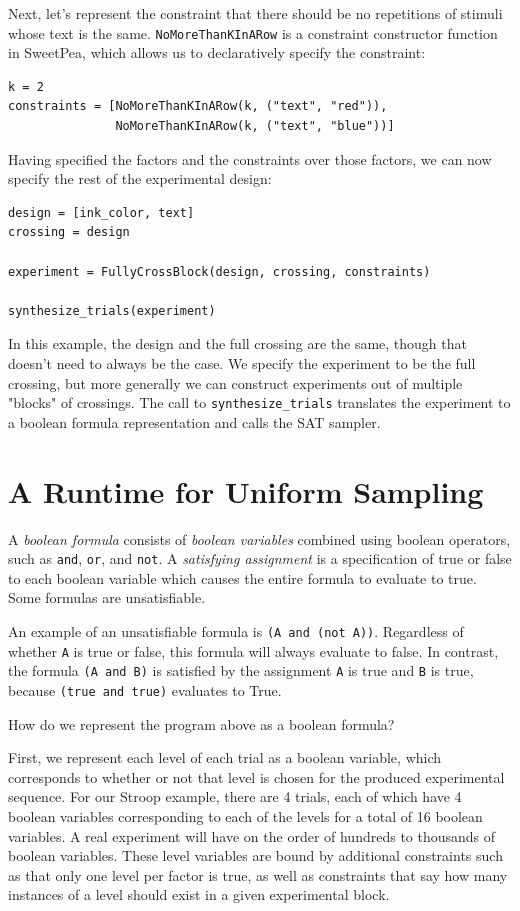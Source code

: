 Next, let's represent the constraint that there should be no repetitions of stimuli whose text is the same. \texttt{NoMoreThanKInARow} is a constraint constructor function in SweetPea, which allows us to declaratively specify the constraint:

\begin{verbatim}
k = 2
constraints = [NoMoreThanKInARow(k, ("text", "red")),
               NoMoreThanKInARow(k, ("text", "blue"))]
\end{verbatim}

Having specified the factors and the constraints over those factors, we can now specify the rest of the experimental design:

\begin{verbatim}
design = [ink_color, text]
crossing = design

experiment = FullyCrossBlock(design, crossing, constraints)

synthesize_trials(experiment)
\end{verbatim}

In this example, the design and the full crossing are the same, though that doesn't need to always be the case. We specify the experiment to be the full crossing, but more generally we can construct experiments out of multiple "blocks" of crossings. The call to \texttt{synthesize\_trials} translates the experiment to a boolean formula representation and calls the SAT sampler.

\section{A Runtime for Uniform Sampling}

A \emph{boolean formula} consists of \emph{boolean variables} combined using boolean operators, such as \texttt{and}, \texttt{or}, and \texttt{not}. A \emph{satisfying assignment} is a specification of true or false to each boolean variable which causes the entire formula to evaluate to true. Some formulas are unsatisfiable.

An example of an unsatisfiable formula is \texttt{(A and (not A))}. Regardless of whether \texttt{A} is true or false, this formula will always evaluate to false. In contrast, the formula \texttt{(A and B)} is satisfied by the assignment \texttt{A} is true and \texttt{B} is true, because \texttt{(true and true)} evaluates to True.

How do we represent the program above as a boolean formula?

First, we represent each level of each trial as a boolean variable, which corresponds to whether or not that level is chosen for the produced experimental sequence. For our Stroop example, there are 4 trials, each of which have 4 boolean variables corresponding to each of the levels for a total of 16 boolean variables. A real experiment will have on the order of hundreds to thousands of boolean variables. These level variables are bound by additional constraints such as that only one level per factor is true, as well as constraints that say how many instances of a level should exist in a given experimental block.

